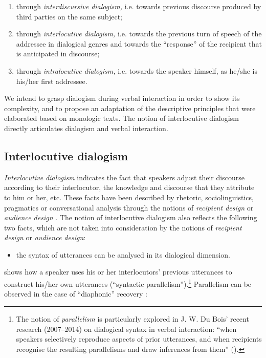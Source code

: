 \documentclass[output=paper]{langscibook}
\begin{document}
\begin{enumerate}

\item through {\textit{interdiscursive dialogism,} }{i.e. towards previous discourse produced by third parties on the same subject;} 

\item through {\textit{interlocutive}}{} {\textit{dialogism,} }{i.e}{.}{ towards the previous turn of speech of the addressee in dialogical genres and towards the “response” of the recipient that is anticipated in discourse;} 

\item  through {\textit{intralocutive dialogism,} }{i.e. towards the speaker himself, as he/she is his/her first addressee.} 

\end{enumerate}

{We intend to grasp dialogism during verbal interaction in order to show its complexity, and to propose an adaptation of the descriptive principles that were elaborated based on monologic texts. The notion of interlocutive dialogism directly articulates dialogism and verbal interaction.}

\subsection{Interlocutive dialogism} 

\textit{Interlocutive dialogism} indicates the fact that speakers adjust their discourse according to their interlocutor, the knowledge and discourse that they attribute to him or her, etc. These facts have been described by rhetoric, sociolinguistics, pragmatics or conversational analysis through the notions of \textit{recipient design} \citep{SacksEtAl1974} or \textit{audience design} \citep{ClarkMurphy1982,Bell1984}. The notion of interlocutive dialogism also reflects the following two facts, which are not taken into consideration by the notions of \textit{recipient design}  or  \textit{audience design}:

\begin{itemize}
\item the syntax of utterances can be analysed in its dialogical dimension. 
\end{itemize}

\citet{DuBois2014} shows how a speaker uses his or her interlocutors’ previous utterances to construct his/her own utterances (“syntactic parallelism”).\footnote{The notion of \textit{parallelism} is particularly explored in J. W. Du Bois' recent research (2007--2014) on dialogical syntax in verbal interaction: “when speakers selectively reproduce aspects of prior utterances, and when recipients recognise the resulting parallelisms and draw inferences from them” (\citeyear[359]{DuBois2014}).} Parallelism can be observed in the case of “diaphonic” recovery \citep{RouletEtAl1985}:
\end{document}
